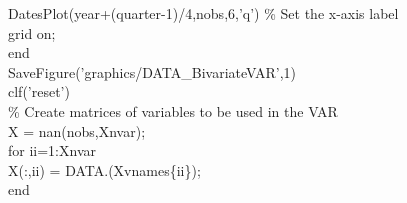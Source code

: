 \hspace{1mm}\hspace{5mm} \hspace{5mm} \hspace{5mm} DatesPlot(year+(quarter-1)/4,nobs,6,\textcolor{matlabpurple}{'q'}) \textcolor{matlabgreen}{\% Set the x-axis label  }\\ 
\hspace{1mm}\hspace{5mm} \hspace{5mm} \hspace{5mm} grid on;  \\ 
\hspace{1mm}\hspace{5mm} \hspace{5mm} \textcolor{matlabblue}{end} \\ 
\hspace{1mm}\hspace{5mm} \hspace{5mm} SaveFigure(\textcolor{matlabpurple}{'graphics/DATA\_BivariateVAR'},1) \\ 
\hspace{1mm}\hspace{5mm} \hspace{5mm} clf(\textcolor{matlabpurple}{'reset'}) \\ 
\hspace{1mm}\hspace{5mm} \hspace{5mm} \textcolor{matlabgreen}{\% Create matrices of variables to be used in the VAR }\\ 
\hspace{1mm}\hspace{5mm} \hspace{5mm} X = nan(nobs,Xnvar); \\ 
\hspace{1mm}\hspace{5mm} \hspace{5mm} \textcolor{matlabblue}{for} ii=1:Xnvar \\ 
\hspace{1mm}\hspace{5mm} \hspace{5mm} \hspace{5mm} X(:,ii) = DATA.(Xvnames\{ii\}); \\ 
\hspace{1mm}\hspace{5mm} \hspace{5mm} \textcolor{matlabblue}{end} \\ 
